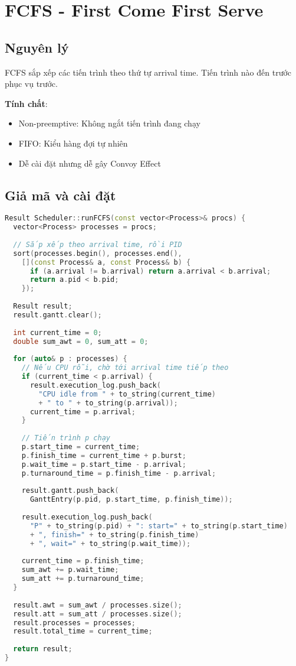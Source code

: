 \section{FCFS - First Come First Serve}

\subsection{Nguyên lý}

FCFS sắp xếp các tiến trình theo thứ tự arrival time. Tiến trình nào đến trước phục vụ trước.

\textbf{Tính chất}:
\begin{itemize}[leftmargin=1.5cm]
  \item Non-preemptive: Không ngắt tiến trình đang chạy
  \item FIFO: Kiểu hàng đợi tự nhiên
  \item Dễ cài đặt nhưng dễ gây Convoy Effect
\end{itemize}

\subsection{Giả mã và cài đặt}

\begin{lstlisting}[language=C++,caption={Cài đặt FCFS}]
Result Scheduler::runFCFS(const vector<Process>& procs) {
  vector<Process> processes = procs;
  
  // Sắp xếp theo arrival time, rồi PID
  sort(processes.begin(), processes.end(), 
    [](const Process& a, const Process& b) {
      if (a.arrival != b.arrival) return a.arrival < b.arrival;
      return a.pid < b.pid;
    });
  
  Result result;
  result.gantt.clear();
  
  int current_time = 0;
  double sum_awt = 0, sum_att = 0;
  
  for (auto& p : processes) {
    // Nếu CPU rỗi, chờ tới arrival time tiếp theo
    if (current_time < p.arrival) {
      result.execution_log.push_back(
        "CPU idle from " + to_string(current_time) 
        + " to " + to_string(p.arrival));
      current_time = p.arrival;
    }
    
    // Tiến trình p chạy
    p.start_time = current_time;
    p.finish_time = current_time + p.burst;
    p.wait_time = p.start_time - p.arrival;
    p.turnaround_time = p.finish_time - p.arrival;
    
    result.gantt.push_back(
      GanttEntry(p.pid, p.start_time, p.finish_time));
    
    result.execution_log.push_back(
      "P" + to_string(p.pid) + ": start=" + to_string(p.start_time)
      + ", finish=" + to_string(p.finish_time)
      + ", wait=" + to_string(p.wait_time));
    
    current_time = p.finish_time;
    sum_awt += p.wait_time;
    sum_att += p.turnaround_time;
  }
  
  result.awt = sum_awt / processes.size();
  result.att = sum_att / processes.size();
  result.processes = processes;
  result.total_time = current_time;
  
  return result;
}
\end{lstlisting}

